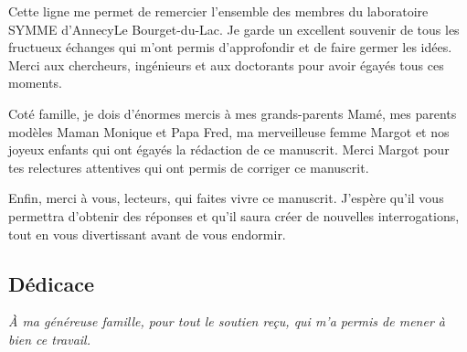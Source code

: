 \bigskip
\noindent
Cette ligne me permet de remercier l'ensemble des membres du laboratoire SYMME d'Annecy\textendash Le Bourget-du-Lac.
Je garde un excellent souvenir de tous les fructueux échanges qui m'ont permis d'approfondir et de faire germer les idées.
Merci aux chercheurs, ingénieurs et aux doctorants pour avoir égayés tous ces moments.

\bigskip
\noindent
Coté famille, je dois d'énormes mercis à mes grands-parents \textemdash Mamé\textemdash, mes parents modèles \textemdash Maman Monique et Papa Fred\textemdash, ma merveilleuse femme Margot et nos joyeux enfants qui ont égayés la rédaction de ce manuscrit.
Merci Margot pour tes relectures attentives qui ont permis de corriger ce manuscrit.

\bigskip
\noindent
Enfin, merci à vous, lecteurs, qui faites vivre ce manuscrit.
J'espère qu'il vous permettra d'obtenir des réponses et qu'il saura créer de nouvelles interrogations, tout en vous divertissant avant de vous endormir.


\vspace*{1.5cm}
\begin{flushright}
	\section*{\fontsize{20pt}{20pt}\selectfont\textnormal{Dédicace}}
\end{flushright}
\begin{flushright}
\emph{À ma généreuse famille, pour tout le soutien reçu, qui m'a permis de mener à bien ce travail.} \\
\end{flushright}
